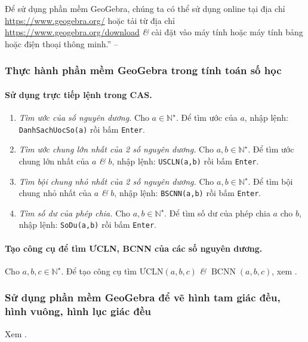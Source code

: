 \documentclass{article}
\numberwithin{equation}{section}
\begin{document}
Để sử dụng phần mềm GeoGebra, chúng ta có thể sử dụng online tại địa chỉ \url{https://www.geogebra.org/} hoặc tải từ địa chỉ \url{https://www.geogebra.org/download} \textit{\&} cài đặt vào máy tính hoặc máy tính bảng hoặc điện thoại thông minh.'' -- \cite[p. 119]{SGK_Toan_6_Canh_Dieu_tap_1}

\subsubsection{Thực hành phần mềm GeoGebra trong tính toán số học}

\paragraph{Sử dụng trực tiếp lệnh trong CAS.}
\begin{enumerate}
	\item \textit{Tìm ước của số nguyên dương.} Cho $a\in\mathbb{N}^\star$. Để tìm ước của $a$, nhập lệnh: \texttt{DanhSachUocSo(a)} rồi bấm \texttt{Enter}.
	\item \textit{Tìm ước chung lớn nhất của 2 số nguyên dương.} Cho $a,b\in\mathbb{N}^\star$. Để tìm ước chung lớn nhất của $a$ \textit{\&} $b$, nhập lệnh: \texttt{USCLN(a,b)} rồi bấm \texttt{Enter}.
	\item \textit{Tìm bội chung nhỏ nhất của 2 số nguyên dương.} Cho $a,b\in\mathbb{N}^\star$. Để tìm bội chung nhỏ nhất của $a$ \textit{\&} $b$, nhập lệnh: \texttt{BSCNN(a,b)} rồi bấm \texttt{Enter}.
	\item \textit{Tìm số dư của phép chia.} Cho $a,b\in\mathbb{N}^\star$. Để tìm số dư của phép chia $a$ cho $b$, nhập lệnh: \texttt{SoDu(a,b)} rồi bấm \texttt{Enter}.
\end{enumerate}

\paragraph{Tạo công cụ để tìm ƯCLN, BCNN của các số nguyên dương.} Cho $a,b,c\in\mathbb{N}^\star$. Để tạo công cụ tìm $\mbox{ƯCLN}(a,b,c)$ \textit{\&} $\operatorname{BCNN}(a,b,c)$, xem \cite[pp. 120--121]{SGK_Toan_6_Canh_Dieu_tap_1}.

\subsubsection{Sử dụng phần mềm GeoGebra để vẽ hình tam giác đều, hình vuông, hình lục giác đều}
Xem \cite[pp. 122--124]{SGK_Toan_6_Canh_Dieu_tap_1}.
\end{document}
